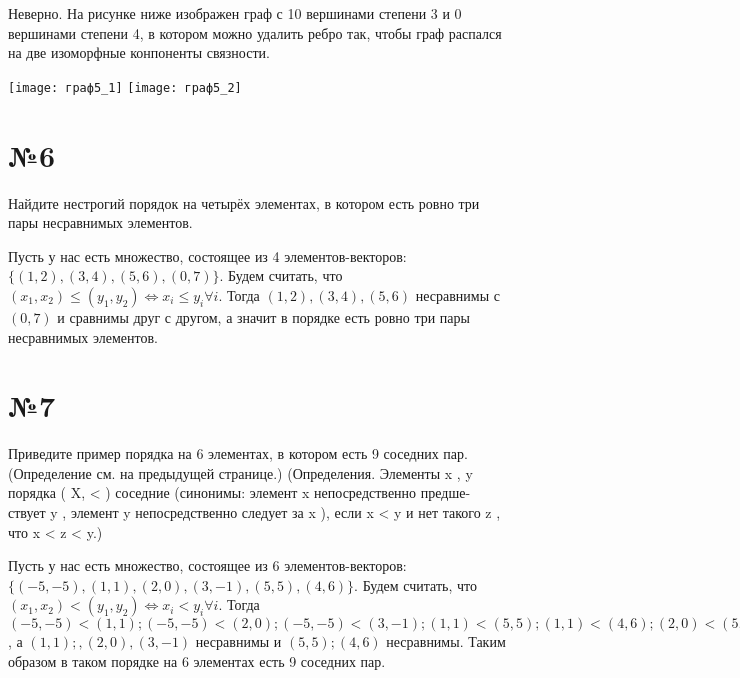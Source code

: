 \documentclass[a4paper, 16pt]{article}
\newenvironment{solution}[1][Решение]{%
	\begin{trivlist}
		\item[\hskip \labelsep {\bfseries #1:}]
		\item \hspace{15pt}
	}{
	\end{trivlist}
}
\begin{document}
			\begin{solution}
				Неверно. На рисунке ниже изображен граф с 10 вершинами степени 3 и 0 вершинами степени 4, в котором можно удалить ребро так, чтобы граф распался на две изоморфные конпоненты связности.
				
				\texttt{[image: граф5\_1]}
				\texttt{[image: граф5\_2]}
			\end{solution}
		
		\section*{№6}
		
			Найдите нестрогий порядок на четырёх элементах, в котором есть ровно три пары несравнимых элементов.
			
			\begin{solution}
				Пусть у нас есть множество, состоящее из 4 элементов-векторов: $\{(1, 2), (3, 4), (5, 6), (0, 7)\}$. Будем считать, что $(x_1, x_2) \leq (y_1, y_2) \Leftrightarrow x_i \leq y_i \forall i$. Тогда $(1, 2), (3, 4), (5, 6)$ несравнимы с $(0, 7)$ и сравнимы друг с другом, а значит в порядке есть ровно три пары несравнимых элементов.
			\end{solution}
		
		\section*{№7}
		
			Приведите пример порядка на 6 элементах, в котором есть 9 соседних пар. (Определение см. на
			предыдущей странице.) (Определения.
			Элементы
			x
			,
			y
			порядка
			(
			X, <
			)
			соседние
			(синонимы: элемент
			x
			непосредственно предше-
			ствует
			y
			, элемент
			y
			непосредственно следует за
			x
			), если
			x < y
			и нет такого
			z
			, что
			x < z < y.)
			
			\begin{solution}
				Пусть у нас есть множество, состоящее из 6 элементов-векторов: $\{(-5, -5), (1, 1), (2, 0), (3, -1), (5, 5), (4, 6)\}$. Будем считать, что $(x_1, x_2) < (y_1, y_2) \Leftrightarrow x_i < y_i \forall i$. Тогда $(-5, -5) < (1, 1); (-5, -5) < (2, 0); (-5, -5) < (3, -1); (1, 1) < (5, 5); (1, 1) < (4, 6); (2, 0) < (5, 5); (2, 0) < (4, 6); (3, -1) < (5, 5); (3, -1) < (4, 6)$, а $(1, 1); ,(2, 0), (3, -1)$ несравнимы и $(5, 5); (4, 6)$ несравнимы. Таким образом в таком порядке на 6 элементах есть 9 соседних пар.
			\end{solution}
	
	
	
	
	
	
	
	
	
		
		
	
	
	
	
	
	
	
	
	
	
	
	
	
	
\end{document}
